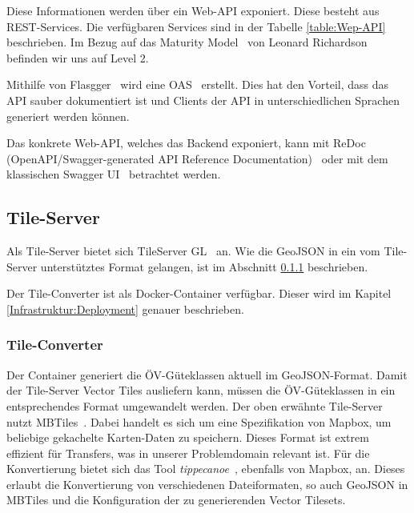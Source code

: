 Diese Informationen werden über ein Web-\ac{API} exponiert.
Diese besteht aus \acl{REST}-Services.
Die verfügbaren Services sind in der Tabelle \ref{table:Wep-API} beschrieben.
Im Bezug auf das Maturity Model~\cite{maturity_model} von Leonard Richardson befinden wir uns auf Level 2.

Mithilfe von Flasgger~\cite{flasgger} wird eine \ac{OAS}~\cite{open-api-specificaiton} erstellt.
Dies hat den Vorteil, dass das \ac{API} sauber dokumentiert ist und Clients der \ac{API} in unterschiedlichen Sprachen generiert werden können.

Das konkrete Web-\ac{API}, welches das Backend exponiert, kann mit ReDoc (OpenAPI/Swagger-generated API Reference Documentation)~\cite{oevgk18-backend-api-spec} oder mit dem klassischen Swagger UI~\cite{oevgk18-backend-api-swaggerui} betrachtet werden.

\subsection{Tile-Server}
\label{Implementation:Tile-Server}

Als Tile-Server bietet sich TileServer GL~\cite{tile-server-gl} an.
Wie die \gls{GeoJSON} in ein vom Tile-Server unterstütztes Format gelangen, ist im Abschnitt \ref{Implementation:Tile-Converter} beschrieben.

Der Tile-Converter ist als Docker-Container verfügbar.
Dieser wird im Kapitel \ref{Infrastruktur:Deployment} genauer beschrieben.


\subsubsection{Tile-Converter}
\label{Implementation:Tile-Converter}

Der Container  generiert die \gls{ÖV-Güteklassen} aktuell im \gls{GeoJSON}-Format.
Damit der Tile-Server Vector Tiles ausliefern kann, müssen die \gls{ÖV-Güteklassen} in ein entsprechendes Format umgewandelt werden.
Der oben erwähnte Tile-Server nutzt MBTiles~\cite{mbtiles}.
Dabei handelt es sich um eine Spezifikation von Mapbox, um beliebige gekachelte Karten-Daten zu speichern.
Dieses Format ist extrem effizient für Transfers, was in unserer Problemdomain relevant ist.
Für die Konvertierung bietet sich das Tool \emph{tippecanoe}~\cite{tippecanoe}, ebenfalls von Mapbox, an.
Dieses erlaubt die Konvertierung von verschiedenen Dateiformaten, so auch \gls{GeoJSON} in MBTiles und die Konfiguration der zu generierenden Vector Tilesets.

